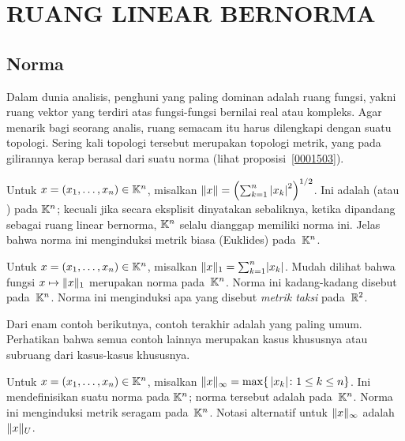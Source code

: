 \chapter{RUANG LINEAR BERNORMA}

\section{Norma}
Dalam dunia analisis, penghuni yang paling dominan adalah ruang fungsi, yakni ruang vektor
yang terdiri atas fungsi-fungsi bernilai real atau kompleks. Agar menarik bagi seorang analis,
ruang semacam itu harus dilengkapi dengan suatu topologi. Sering kali topologi tersebut
merupakan topologi metrik, yang pada gilirannya kerap berasal dari suatu norma (lihat
proposisi~\ref{0001503}).

\begin{exam}\label{C023125} Untuk $x = (x_1,\dots, x_n) \in \mathbb{K}^n$, misalkan $\lVert x\rVert =
\left(\sum_{k=1}^n {\lvert x_k\rvert}^2\right)^{1/2}$. Ini adalah
 (atau
) pada $\mathbb{K}^n$; kecuali jika secara eksplisit dinyatakan sebaliknya,
ketika dipandang sebagai ruang linear bernorma, $\mathbb{K}^n$ selalu dianggap memiliki norma ini.
Jelas bahwa norma ini menginduksi metrik biasa (Euklides) pada~$\mathbb{K}^n$.
\end{exam}

\begin{exam}\label{C023127} Untuk $x = (x_1,\dots,x_n) \in \mathbb{K}^n$, misalkan
$\lVert x\rVert_1 = \sum_{k=1}^n \lvert x_k\rvert$. Mudah dilihat bahwa fungsi $x \mapsto \lVert x\rVert_1$
merupakan norma pada~$\mathbb{K}^n$. Norma ini kadang-kadang disebut
 pada~$\mathbb{K}^n$. Norma ini menginduksi apa yang disebut \emph{metrik taksi}
pada~$\mathbb{R}^2$.
\end{exam}

Dari enam contoh berikutnya, contoh terakhir adalah yang paling umum. Perhatikan bahwa
semua contoh lainnya merupakan kasus khususnya atau subruang dari kasus-kasus khususnya.

\begin{exam}\label{C023129} Untuk $x = (x_1,\dots,x_n) \in \mathbb{K}^n$, misalkan
$\lVert x\rVert_\infty = \max\{\,\lvert x_k\rvert \colon 1 \le k \le n\}$. Ini mendefinisikan suatu
norma pada $\mathbb{K}^n$; norma tersebut adalah
 pada~$\mathbb{K}^n$. Norma ini menginduksi metrik seragam pada~$\mathbb{K}^n$.
Notasi alternatif untuk $\lVert x\rVert_\infty$ adalah $\lVert x\rVert_U$.
\end{exam}

